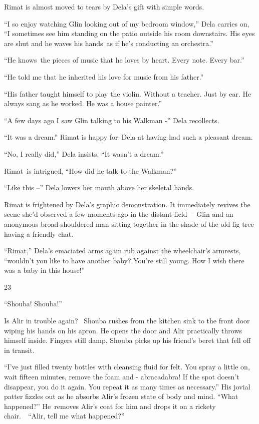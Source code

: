 \documentclass[twoside,11pt]{book}
\begin{document}
Rimat is almost moved to tears by Dela's gift with simple words.

``I so enjoy watching Glin looking out of my bedroom window,'' Dela carries on,
``I sometimes see him standing on the patio outside his room downstairs. His eyes are shut and he waves
his hands~as if he's conducting an orchestra.'' 

``He knows\ the pieces of music that he loves by heart. Every note. Every bar.''

``He told me that he inherited his love for music from his father.''

``His father taught himself to play the violin. Without a teacher. Just by ear. He always sang as he
worked. He was a house painter.''

``A few days ago I saw Glin talking to his Walkman -'' Dela recollects.

``It was a dream.'' Rimat is happy for~Dela at having had such a pleasant dream.

``No, I really did,'' Dela insists. ``It wasn't a dream.''

Rimat~is intrigued, ``How did he talk to the Walkman?''

``Like this --'' Dela lowers her mouth above her skeletal hands. 

Rimat is frightened by Dela's graphic demonstration. It immediately revives the scene she'd observed a few moments ago
in the distant field\ {}-- Glin and an anonymous broad-shouldered man sitting together in the shade of the old fig tree
having a friendly chat.\ 

``Rimat,'' Dela's emaciated arms again rub against the wheelchair's armrests,
``wouldn't you like to have another baby? You're still young. How I wish there was a baby in this
house!''


\bigskip

23~

``Shouba! Shouba!''

Is Alir in trouble again?~ Shouba rushes from the kitchen sink to the front door wiping his hands on his apron. He opens
the door and Alir practically throws himself inside. Fingers still damp, Shouba picks up his friend's beret that fell
off in transit. 

``I've just filled twenty bottles with cleansing fluid for felt. You spray a little on, wait fifteen
minutes, remove the foam and - abracadabra! If the spot doesn't disappear, you do it again. You repeat it as many times
as necessary.'' His jovial patter fizzles out as he absorbs Alir's frozen state of body and mind.
``What happened?'' He\ removes Alir's coat for him and drops it on a rickety
chair.\ \ ``Alir, tell me what happened?'' 
\end{document}
